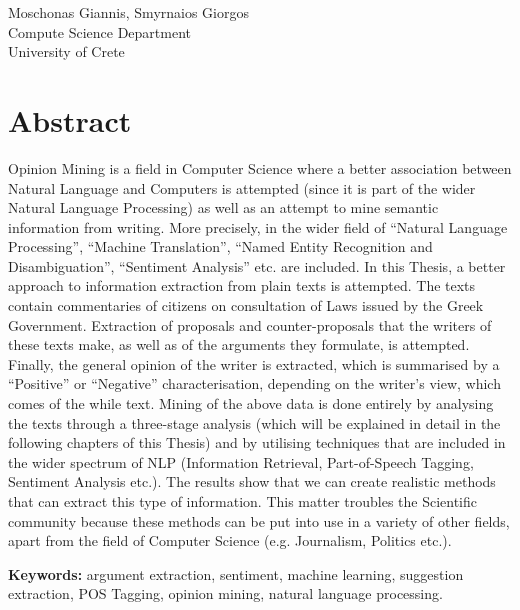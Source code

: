 Moschonas Giannis, Smyrnaios Giorgos\\
Compute Science Department\\
University of Crete \setlength{\parskip}{0.5cm}

\thispagestyle{plain}			%
\setlength{\parskip}{0pt plus 1.0pt}
\section*{Abstract}
Opinion Mining is a field in Computer Science where a better association between Natural Language and Computers is attempted (since it is part of the wider Natural Language Processing) as well as an attempt to mine semantic information from writing. More precisely, in the wider field of ``Natural Language Processing'', ``Machine Translation'', ``Named Entity Recognition and Disambiguation'', ``Sentiment Analysis'' etc. are included. In this Thesis, a better approach to information extraction from plain texts is attempted. The texts contain commentaries of citizens on consultation of Laws issued by the Greek Government. Extraction of proposals and counter-proposals that the writers of these texts make, as well as of the arguments they formulate, is attempted. Finally, the general opinion of the writer is extracted, which is summarised by a ``Positive'' or ``Negative'' characterisation, depending on  the writer's view, which comes of the while text. Mining of the above data is done entirely by analysing the texts through a three-stage analysis (which will be explained in detail in the following chapters of this Thesis) and by utilising techniques that are included in the wider spectrum of NLP (Information Retrieval, Part-of-Speech Tagging, Sentiment Analysis etc.). The results show that we can create realistic methods that can extract this type of information. This matter troubles the Scientific community because these methods can be put into use in a variety of other fields, apart from the field of Computer Science (e.g. Journalism, Politics etc.).





\vfill
\textbf{Keywords:} argument extraction, sentiment, machine learning, suggestion extraction, POS Tagging, opinion mining, natural language processing.
